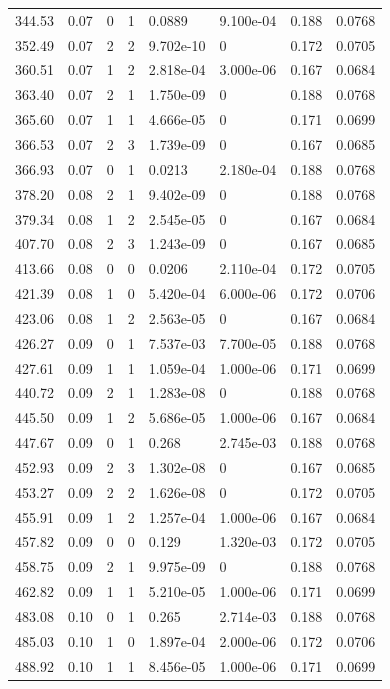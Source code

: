 \documentclass[preview]{standalone}
\begin{document}
{{{\begin{tabular}{L{1.2cm}C{1.2cm} C{0.3cm}C{0.5cm} C{1.4cm}C{1.4cm} C{1.4cm}C{1.4cm}}
  344.53  &  0.07  & 0     &  1 &  0.0889  & 9.100e-04  & 0.188 &  0.0768   \\ 
  352.49  &  0.07  & 2     &  2 &  9.702e-10  & 0  & 0.172 &  0.0705   \\ 
  360.51  &  0.07  & 1     &  2 &  2.818e-04  & 3.000e-06  & 0.167 &  0.0684   \\ 
  363.40  &  0.07  & 2     &  1 &  1.750e-09  & 0  & 0.188 &  0.0768   \\ 
  365.60  &  0.07  & 1     &  1 &  4.666e-05  & 0  & 0.171 &  0.0699   \\ 
  366.53  &  0.07  & 2     &  3 &  1.739e-09  & 0  & 0.167 &  0.0685   \\ 
  366.93  &  0.07  & 0     &  1 &  0.0213  & 2.180e-04  & 0.188 &  0.0768   \\ 
  378.20  &  0.08  & 2     &  1 &  9.402e-09  & 0  & 0.188 &  0.0768   \\ 
  379.34  &  0.08  & 1     &  2 &  2.545e-05  & 0  & 0.167 &  0.0684   \\ 
  407.70  &  0.08  & 2     &  3 &  1.243e-09  & 0  & 0.167 &  0.0685   \\ 
  413.66  &  0.08  & 0     &  0 &  0.0206  & 2.110e-04  & 0.172 &  0.0705   \\ 
  421.39  &  0.08  & 1     &  0 &  5.420e-04  & 6.000e-06  & 0.172 &  0.0706   \\ 
  423.06  &  0.08  & 1     &  2 &  2.563e-05  & 0  & 0.167 &  0.0684   \\ 
  426.27  &  0.09  & 0     &  1 &  7.537e-03  & 7.700e-05  & 0.188 &  0.0768   \\ 
  427.61  &  0.09  & 1     &  1 &  1.059e-04  & 1.000e-06  & 0.171 &  0.0699   \\ 
  440.72  &  0.09  & 2     &  1 &  1.283e-08  & 0  & 0.188 &  0.0768   \\ 
  445.50  &  0.09  & 1     &  2 &  5.686e-05  & 1.000e-06  & 0.167 &  0.0684   \\ 
  447.67  &  0.09  & 0     &  1 &  0.268  & 2.745e-03  & 0.188 &  0.0768   \\ 
  452.93  &  0.09  & 2     &  3 &  1.302e-08  & 0  & 0.167 &  0.0685   \\ 
  453.27  &  0.09  & 2     &  2 &  1.626e-08  & 0  & 0.172 &  0.0705   \\ 
  455.91  &  0.09  & 1     &  2 &  1.257e-04  & 1.000e-06  & 0.167 &  0.0684   \\ 
  457.82  &  0.09  & 0     &  0 &  0.129  & 1.320e-03  & 0.172 &  0.0705   \\ 
  458.75  &  0.09  & 2     &  1 &  9.975e-09  & 0  & 0.188 &  0.0768   \\ 
  462.82  &  0.09  & 1     &  1 &  5.210e-05  & 1.000e-06  & 0.171 &  0.0699   \\ 
  483.08  &  0.10  & 0     &  1 &  0.265  & 2.714e-03  & 0.188 &  0.0768   \\ 
  485.03  &  0.10  & 1     &  0 &  1.897e-04  & 2.000e-06  & 0.172 &  0.0706   \\ 
  488.92  &  0.10  & 1     &  1 &  8.456e-05  & 1.000e-06  & 0.171 &  0.0699   \\ 
\hline 
\end{tabular} 

}}}
\end{document}
